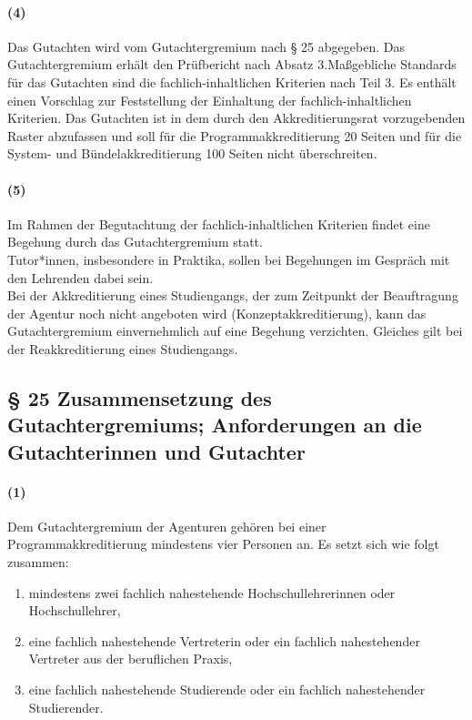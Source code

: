\documentclass[a4paper]{scrartcl}
\begin{document}
\paragraph{(4)} Das Gutachten wird vom Gutachtergremium nach § 25 abgegeben. Das Gutachtergremium erhält den Prüfbericht nach Absatz 3.Maßgebliche Standards für das Gutachten sind die fachlich-inhaltlichen Kriterien nach Teil 3. Es enthält einen Vorschlag zur Feststellung der Einhaltung der fachlich-inhaltlichen Kriterien. Das Gutachten ist in dem durch den Akkreditierungsrat vorzugebenden Raster abzufassen und soll für die Programmakkreditierung 20 Seiten und für die System- und Bündelakkreditierung 100 Seiten nicht überschreiten.
\paragraph{(5)} Im Rahmen der Begutachtung der fachlich-inhaltlichen Kriterien findet eine Begehung durch das Gutachtergremium statt. \\

\textcolor{Bernd}{\textbf{\cite{PROT: WiSe2015-RL}} Tutor*innen, insbesondere in Praktika, sollen bei Begehungen im Gespräch mit den Lehrenden dabei sein.}\\

Bei der Akkreditierung eines Studiengangs, der zum Zeitpunkt der Beauftragung der Agentur noch nicht angeboten wird (Konzeptakkreditierung), kann das Gutachtergremium einvernehmlich auf eine Begehung verzichten. Gleiches gilt bei der Reakkreditierung eines Studiengangs.
\subsection{§ 25 Zusammensetzung des Gutachtergremiums;
Anforderungen an die Gutachterinnen und Gutachter}
\paragraph{(1)} Dem Gutachtergremium der Agenturen gehören bei einer Programmakkreditierung mindestens vier Personen an. Es setzt sich wie folgt zusammen:
\begin{enumerate}
\item mindestens zwei fachlich nahestehende Hochschullehrerinnen oder
Hochschullehrer,
\item eine fachlich nahestehende Vertreterin oder ein fachlich nahestehender
Vertreter aus der beruflichen Praxis,
\item eine fachlich nahestehende Studierende oder ein fachlich nahestehender Studierender.
\end{enumerate}
\end{document}
